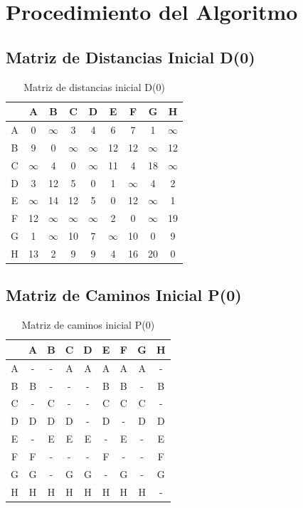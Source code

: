 \documentclass[12pt]{article}
\begin{document}
\clearpage
\section{Procedimiento del Algoritmo}
\subsection{Matriz de Distancias Inicial D(0)}
\begin{table}[h!]
\centering
\begin{tabular}{|c|c|c|c|c|c|c|c|c|}
\hline
 & A & B & C & D & E & F & G & H \\\hline
A & 0 & $\infty$ & 3 & 4 & 6 & 7 & 1 & $\infty$ \\\hline
B & 9 & 0 & $\infty$ & $\infty$ & 12 & 12 & $\infty$ & 12 \\\hline
C & $\infty$ & 4 & 0 & $\infty$ & 11 & 4 & 18 & $\infty$ \\\hline
D & 3 & 12 & 5 & 0 & 1 & $\infty$ & 4 & 2 \\\hline
E & $\infty$ & 14 & 12 & 5 & 0 & 12 & $\infty$ & 1 \\\hline
F & 12 & $\infty$ & $\infty$ & $\infty$ & 2 & 0 & $\infty$ & 19 \\\hline
G & 1 & $\infty$ & 10 & 7 & $\infty$ & 10 & 0 & 9 \\\hline
H & 13 & 2 & 9 & 9 & 4 & 16 & 20 & 0 \\\hline
\end{tabular}
\caption{Matriz de distancias inicial D(0)}
\end{table}

\clearpage
\subsection{Matriz de Caminos Inicial P(0)}
\begin{table}[h!]
\centering
\begin{tabular}{|c|c|c|c|c|c|c|c|c|}
\hline
 & A & B & C & D & E & F & G & H \\\hline
A & - & - & A & A & A & A & A & - \\\hline
B & B & - & - & - & B & B & - & B \\\hline
C & - & C & - & - & C & C & C & - \\\hline
D & D & D & D & - & D & - & D & D \\\hline
E & - & E & E & E & - & E & - & E \\\hline
F & F & - & - & - & F & - & - & F \\\hline
G & G & - & G & G & - & G & - & G \\\hline
H & H & H & H & H & H & H & H & - \\\hline
\end{tabular}
\caption{Matriz de caminos inicial P(0)}
\end{table}
\end{document}
